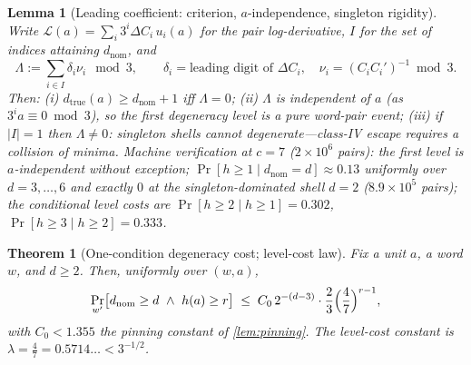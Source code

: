\documentclass[11pt]{article}
\theoremstyle{plain}
\newtheorem{theorem}{Theorem}
\newtheorem{lemma}{Lemma}
\theoremstyle{definition}
\theoremstyle{remark}
\begin{document}
\begin{lemma}[Leading coefficient: criterion, $a$-independence,
singleton rigidity]\label{lem:leadcoeff}
Write $\mathcal L(a)=\sum_i3^i\Delta C_i\,u_i(a)$ for the pair
log-derivative, $I$ for the set of indices attaining $d_{\mathrm{nom}}$,
and
\[
\Lambda:=\sum_{i\in I}\delta_i\nu_i\ \bmod3,
\qquad
\delta_i=\text{leading digit of }\Delta C_i,\quad
\nu_i=(C_iC_i')^{-1}\bmod3 .
\]
Then: (i) $d_{\mathrm{true}}(a)\ge d_{\mathrm{nom}}+1$ iff $\Lambda=0$;
(ii) $\Lambda$ is \emph{independent of $a$} (as $3^ia\equiv0\bmod3$), so
the first degeneracy level is a pure word-pair event; (iii) if $|I|=1$
then $\Lambda\ne0$: \emph{singleton shells cannot degenerate}---class-IV
escape requires a collision of minima. Machine verification at $c=7$
($2\times10^6$ pairs): the first level is $a$-independent without
exception; $\Pr[h\ge1\mid d_{\mathrm{nom}}=d]\approx0.13$ uniformly over
$d=3,\dots,6$ and \emph{exactly} $0$ at the singleton-dominated shell
$d=2$ ($8.9\times10^5$ pairs); the conditional level costs are
$\Pr[h\ge2\mid h\ge1]=0.302$, $\Pr[h\ge3\mid h\ge2]=0.333$.
\end{lemma}

\begin{theorem}[One-condition degeneracy cost; level-cost law]
\label{op:onecond}
Fix a unit $a$, a word $w$, and $d\ge2$. Then, uniformly over $(w,a)$,
\[
\Pr_{w'}\bigl[d_{\mathrm{nom}}\ge d\ \wedge\ h(a)\ge r\bigr]
\;\le\;C_0\,2^{-(d-3)}\cdot\frac23\Bigl(\frac47\Bigr)^{r-1},
\]
with $C_0<1.355$ the pinning constant of \cref{lem:pinning}. The
level-cost constant is $\lambda=\frac47=0.5714\ldots<3^{-1/2}$.
\end{theorem}
\end{document}
